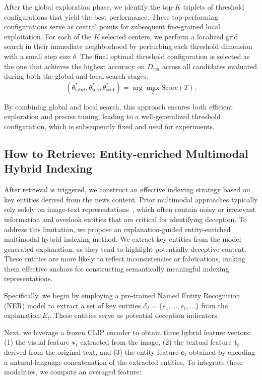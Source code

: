After the global exploration phase, we identify the top-$K$ triplets of threshold configurations that yield the best performance. These top-performing configurations serve as central points for subsequent fine-grained local exploitation.
For each of the $K$ selected centers, we perform a localized grid search in their immediate neighborhood by perturbing each threshold dimension with a small step size $\delta$. The final optimal threshold configuration is selected as the one that achieves the highest accuracy on $D_{val}$ across all candidates evaluated during both the global and local search stages:
\begin{equation}
(\theta_{\text{label}}^*, \theta_{\text{tok}}^*, \theta_{\text{sent}}^*) = \arg\max_{T} \text{Score}(T) .
\end{equation}

By combining global and local search, this approach ensures both efficient exploration and precise tuning, leading to a well-generalized threshold configuration, which is subsequently fixed and used for experiments.


\subsection{How to Retrieve: Entity-enriched Multimodal Hybrid Indexing}
After retrieval is triggered, we construct an effective indexing strategy based on key entities derived from the news content. 
Prior multimodal approaches typically rely solely on image-text representations~\cite{RGCL2024Mei}, which often contain noisy or irrelevant information and overlook entities that are critical for identifying deception.
To address this limitation, we propose an explanation-guided entity-enriched multimodal hybrid indexing method. We extract key entities from the model-generated explanation, as they tend to highlight potentially deceptive content. 
These entities are more likely to reflect inconsistencies or fabrications, making them effective anchors for constructing semantically meaningful indexing representations.

Specifically, we begin by employing a pre-trained Named Entity Recognition (NER) model to extract a set of key entities $\mathcal{E}_t = \{e_1, \dots, e_t, \dots\}$ from the explanation $E_t$. 
These entities serve as potential deception indicators.

Next, we leverage a frozen CLIP encoder to obtain three hybrid feature vectors: (1) the visual feature $\mathbf{v}_t$ extracted from the image, (2) the textual feature $\mathbf{t}_t$ derived from the original text, and (3) the entity feature $\mathbf{e}_t$ obtained by encoding a natural-language concatenation of the extracted entities. To integrate these modalities, we compute an averaged feature:

